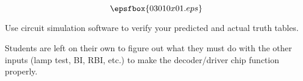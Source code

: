 

$$\epsfbox{03010x01.eps}$$

\vfil \eject






Use circuit simulation software to verify your predicted and actual truth tables.







Students are left on their own to figure out what they must do with the other inputs (lamp test, BI, RBI, etc.) to make the decoder/driver chip function properly.




